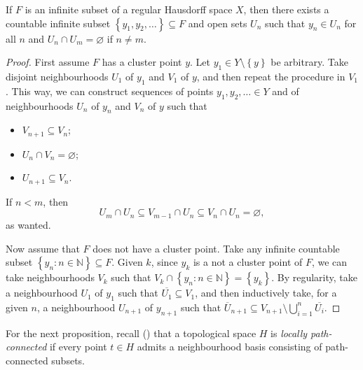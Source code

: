\begin{proposition}\label{propositiondisjointopensets}
If $F$ is an infinite subset of a regular Hausdorff space $X$, then there exists a countable infinite subset $\left\{y_1,y_2,\ldots\right\}\subseteq F$ and open sets $U_n$ such that $y_n\in U_n$ for all $n$ and $U_n\cap U_m=\varnothing$ if $n\neq m$.
\end{proposition}
\begin{proof}
First assume $F$ has a cluster point $y$. Let $y_1\in Y\setminus\left\{y\right\}$ be arbitrary. Take disjoint neighbourhoods $U_1$ of $y_1$ and $V_1$ of $y$, and then repeat the procedure in $V_1$. This way, we can construct sequences of points $y_1,y_2,\ldots\in Y$ and of neighbourhoods $U_n$ of $y_n$ and $V_n$ of $y$ such that
\begin{itemize}
\item $V_{n+1}\subseteq V_n$;
\item $U_n\cap V_n=\varnothing$;
\item $U_{n+1}\subseteq V_n$.
\end{itemize}
If $n<m$, then
\[U_m\cap U_n\subseteq V_{m-1}\cap U_n\subseteq V_n\cap U_n=\varnothing,\]
as wanted.

Now assume that $F$ does not have a cluster point. Take any infinite countable subset $\left\{y_n:n\in\mathbb{N}\right\}\subseteq F$. Given $k$, since $y_k$ is a not a cluster point of $F$, we can take neighbourhoods $V_k$ such that $V_k\cap\left\{y_n:n\in\mathbb{N}\right\}=\left\{y_k\right\}$. By regularity, take a neighbourhood $U_1$ of $y_1$ such that $\overline{U_1}\subseteq V_1$, and then inductively take, for a given $n$, a neighbourhood $U_{n+1}$ of $y_{n+1}$ such that $\overline{U}_{n+1}\subseteq V_{n+1}\setminus\bigcup_{i=1}^n\overline{U_i}$.\qedhere
\end{proof}

For the next proposition, recall (\cite[27.4]{MR0264581}) that a topological space $H$ is \emph{locally path-connected} if every point $t\in H$ admits a neighbourhood basis consisting of path-connected subsets.

